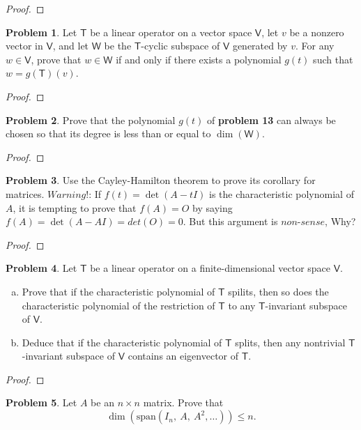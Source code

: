 \documentclass[12pt]{book}
\theoremstyle{definition}
\newtheorem{problem}{Problem}
\begin{document}
	\begin{proof}
	\end{proof}
	\newpage
	\begin{problem}
		Let $\mathsf{T}$ be a linear operator on a vector space $\mathsf{V}$, let $v$ be a nonzero vector in $\mathsf{V}$, and let $\mathsf{W}$ be the $\mathsf{T}$-cyclic subspace of $\mathsf{V}$ generated by $v$. For any $w\in\mathsf{V}$, prove that $w\in\mathsf{W}$ if and only if there exists a polynomial $g(t)$ such that $w=g(\mathsf{T})(v)$.
	\end{problem}
	\begin{proof}
	\end{proof}
	\newpage
	\begin{problem}
		Prove that the polynomial $g(t)$ of \textbf{problem 13} can always be chosen so that its degree is less than or equal to $\dim(\mathsf{W})$.
	\end{problem}
	\begin{proof}
	\end{proof}
	\newpage
	\begin{problem}
		Use the Cayley-Hamilton theorem to prove its corollary for matrices.
		$Warning!$: If $f(t)=\det(A-tI)$ is the characteristic polynomial of $A$, it is tempting to prove that $f(A)=O$ by saying $f(A)=\det(A-AI)=det(O)=0$. But this argument is $non$-$sense$, Why?
	\end{problem}
	\begin{proof}
	\end{proof}
	\newpage
	\begin{problem}
		Let $\mathsf{T}$ be a linear operator on a finite-dimensional vector space $\mathsf{V}$.
		\begin{enumerate}[(a)]
			\item Prove that if the characteristic polynomial of $\mathsf{T}$ spilits, then so does the characteristic polynomial of the restriction of $\mathsf{T}$ to any $\mathsf{T}$-invariant subspace of $\mathsf{V}$.
			\item Deduce that if the characteristic polynomial of $\mathsf{T}$ splits, then any nontrivial $\mathsf{T}$-invariant subspace of $\mathsf{V}$ contains an eigenvector of $\mathsf{T}$.
		\end{enumerate}
	\end{problem}
	\begin{proof}
	\end{proof}
	\newpage
	\begin{problem}
		Let $A$ be an $n\times n$ matrix. Prove that $$\dim\left(\text{span}\left(I_n,~A,~A^2,\ldots\right)\right)\leq n.$$
	\end{problem}
\end{document}

